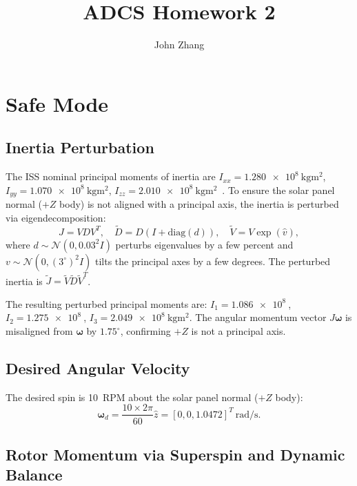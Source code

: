 \documentclass[conference]{IEEEtran}
\title{ADCS Homework 2}
\author{John Zhang}
\begin{document}
\maketitle

\section{Safe Mode}
\label{sec:safe_mode}

\subsection{Inertia Perturbation}

The ISS nominal principal moments of inertia are
$I_{xx} = \SI{1.280e8}{\kilo\gram\meter\squared}$,
$I_{yy} = \SI{1.070e8}{\kilo\gram\meter\squared}$,
$I_{zz} = \SI{2.010e8}{\kilo\gram\meter\squared}$~\cite{nasa_iss}.
To ensure the solar panel normal ($+Z$ body) is not aligned with a principal
axis, the inertia is perturbed via eigendecomposition:
\begin{equation}
  J = V D V^T, \quad
  \tilde{D} = D(I + \text{diag}(d)), \quad
  \tilde{V} = V \exp(\hat{v}),
\end{equation}
where $d \sim \mathcal{N}(0, 0.03^2 I)$ perturbs eigenvalues by a few percent
and $v \sim \mathcal{N}(0, (3^\circ)^2 I)$ tilts the principal axes by a few
degrees.  The perturbed inertia is $\tilde{J} = \tilde{V}\tilde{D}\tilde{V}^T$.

The resulting perturbed principal moments are:
$I_1 = \SI{1.086e8}{}$, $I_2 = \SI{1.275e8}{}$, $I_3 = \SI{2.049e8}{\kilo\gram\meter\squared}$.
The angular momentum vector $J\bm{\omega}$ is misaligned from $\bm{\omega}$ by
$1.75^\circ$, confirming $+Z$ is not a principal axis.

\subsection{Desired Angular Velocity}

The desired spin is \SI{10}{RPM} about the solar panel normal ($+Z$ body):
\begin{equation}
  \bm{\omega}_d = \frac{10 \times 2\pi}{60} \hat{z}
  = [0, 0, 1.0472]^T~\si{\radian/\second}.
\end{equation}

\subsection{Rotor Momentum via Superspin and Dynamic Balance}
\end{document}
